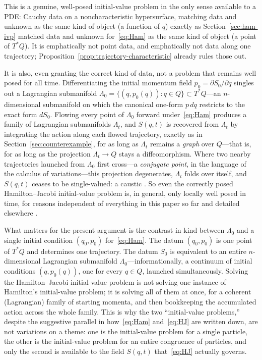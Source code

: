 \documentclass[11pt]{article}
\begin{document}
This is a genuine, well-posed initial-value problem in the only sense available to a PDE: Cauchy data on a noncharacteristic hypersurface, matching data and unknown as the same kind of object (a function of $q$) exactly as Section~\ref{sec:ham-ivp} matched data and unknown for~\eqref{eq:Ham} as the same kind of object (a point of $T^*Q$). It is emphatically not point data, and emphatically not data along one trajectory; Proposition~\ref{prop:trajectory-characteristic} already rules those out.

It is also, even granting the correct kind of data, not a problem that remains well posed for all time. Differentiating the initial momentum field $p_0=\partial S_0/\partial q$ singles out a Lagrangian submanifold $\Lambda_0=\{(q,p_0(q)):q\in Q\}\subset T^*Q$---an $n$-dimensional submanifold on which the canonical one-form $p\,dq$ restricts to the exact form $dS_0$. Flowing every point of $\Lambda_0$ forward under~\eqref{eq:Ham} produces a family of Lagrangian submanifolds $\Lambda_t$, and $S(q,t)$ is recovered from $\Lambda_t$ by integrating the action along each flowed trajectory, exactly as in Section~\ref{sec:counterexample}, for as long as $\Lambda_t$ remains a \emph{graph} over $Q$---that is, for as long as the projection $\Lambda_t\to Q$ stays a diffeomorphism. Where two nearby trajectories launched from $\Lambda_0$ first cross---a \emph{conjugate point}, in the language of the calculus of variations---this projection degenerates, $\Lambda_t$ folds over itself, and $S(q,t)$ ceases to be single-valued: a caustic \citep{arnold1989,gray2009}. So even the correctly posed Hamilton--Jacobi initial-value problem is, in general, only locally well posed in time, for reasons independent of everything in this paper so far and detailed elsewhere \citep{gray2009}.

What matters for the present argument is the contrast in kind between $\Lambda_0$ and a single initial condition $(q_0,p_0)$ for~\eqref{eq:Ham}. The datum $(q_0,p_0)$ is one point of $T^*Q$ and determines one trajectory. The datum $S_0$ is equivalent to an entire $n$-dimensional Lagrangian submanifold $\Lambda_0$---informationally, a continuum of initial conditions $(q,p_0(q))$, one for every $q\in Q$, launched simultaneously. Solving the Hamilton--Jacobi initial-value problem is not solving one instance of Hamilton's initial-value problem; it is solving all of them at once, for a coherent (Lagrangian) family of starting momenta, and then bookkeeping the accumulated action across the whole family. This is why the two ``initial-value problems,'' despite the suggestive parallel in how~\eqref{eq:Ham} and~\eqref{eq:HJ} are written down, are not variations on a theme: one is the initial-value problem for a single particle, the other is the initial-value problem for an entire congruence of particles, and only the second is available to the field $S(q,t)$ that~\eqref{eq:HJ} actually governs.
\end{document}
